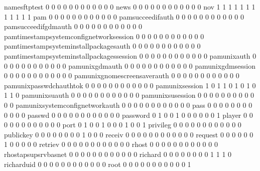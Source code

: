 \documentclass[compress,8pt]{beamer}
\begin{document}
\begin{frame}
\begin{Schunk}
  namesftptest                              0  0  0  0  0  0  0  0  0  0  0  0
  news                                      0  0  0  0  0  0  0  0  0  0  0  0
  nov                                       1  1  1  1  1  1  1  1  1  1  1  1
  pam                                       0  0  0  0  0  0  0  0  0  0  0  0
  pamsucceedifauth                          0  0  0  0  0  0  0  0  0  0  0  0
  pamsucceedifgdmauth                       0  0  0  0  0  0  0  0  0  0  0  0
  pamtimestampsystemconfignetworksession    0  0  0  0  0  0  0  0  0  0  0  0
  pamtimestampsysteminstallpackagesauth     0  0  0  0  0  0  0  0  0  0  0  0
  pamtimestampsysteminstallpackagessession  0  0  0  0  0  0  0  0  0  0  0  0
  pamunixauth                               0  0  0  0  0  0  0  0  0  0  0  0
  pamunixgdmauth                            0  0  0  0  0  0  0  0  0  0  0  0
  pamunixgdmsession                         0  0  0  0  0  0  0  0  0  0  0  0
  pamunixgnomescreensaverauth               0  0  0  0  0  0  0  0  0  0  0  0
  pamunixpasswdchauthtok                    0  0  0  0  0  0  0  0  0  0  0  0
  pamunixsession                            1  0  1  1  0  1  0  1  0  1  1  0
  pamunixsuauth                             0  0  0  0  0  0  0  0  0  0  0  0
  pamunixsusession                          0  0  0  0  0  0  0  0  0  0  0  0
  pamunixsystemconfignetworkauth            0  0  0  0  0  0  0  0  0  0  0  0
  pass                                      0  0  0  0  0  0  0  0  0  0  0  0
  passwd                                    0  0  0  0  0  0  0  0  0  0  0  0
  password                                  0  1  0  0  1  0  0  0  0  0  0  1
  player                                    0  0  0  0  0  0  0  0  0  0  0  0
  port                                      0  1  0  0  1  0  0  0  1  0  0  1
  privileg                                  0  0  0  0  0  0  0  0  0  0  0  0
  publickey                                 0  0  0  0  0  0  0  0  1  0  0  0
  receiv                                    0  0  0  0  0  0  0  0  0  0  0  0
  request                                   0  0  0  0  0  0  1  0  0  0  0  0
  retriev                                   0  0  0  0  0  0  0  0  0  0  0  0
  rhost                                     0  0  0  0  0  0  0  0  0  0  0  0
  rhostapsupsrvbasnet                       0  0  0  0  0  0  0  0  0  0  0  0
  richard                                   0  0  0  0  0  0  0  0  1  1  1  0
  richarduid                                0  0  0  0  0  0  0  0  0  0  0  0
  root                                      0  0  0  0  0  0  0  0  0  0  0  1

\end{Schunk}
\end{frame}
\end{document}
